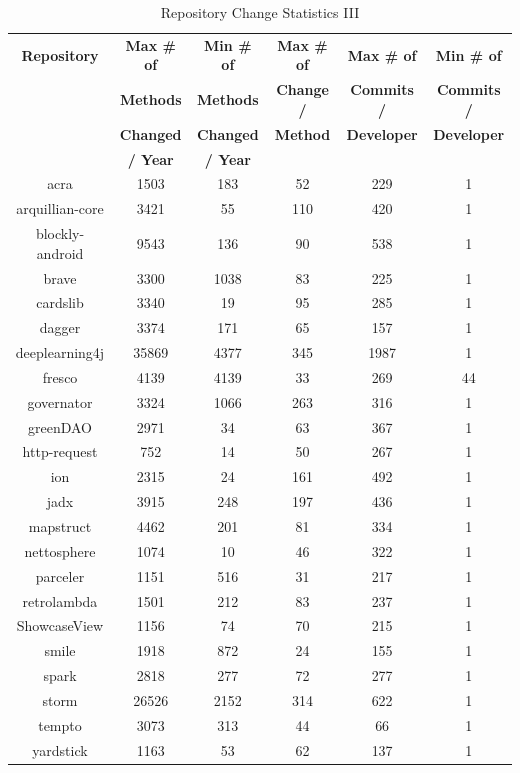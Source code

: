 \begin{table}
\begin{center}
    \begin{tabular}{|c|c|c|c|c|c|}
        \hline
        \textbf{Repository} & \textbf{Max \# of} & \textbf{Min \# of} & \textbf{Max \# of} & \textbf{Max \# of} & \textbf{Min \# of} \\
         & \textbf{Methods} & \textbf{Methods} & \textbf{Change /} & \textbf{Commits /} & \textbf{Commits /} \\
         & \textbf{Changed} & \textbf{Changed} & \textbf{Method} & \textbf{Developer} & \textbf{Developer} \\
         & \textbf{/ Year} & \textbf{/ Year} & & & \\
        \hline
        acra & 1503 & 183 & 52 & 229 & 1 \\
        arquillian-core & 3421 & 55 & 110 & 420 & 1 \\
        blockly-android & 9543 & 136 & 90 & 538 & 1 \\
        brave & 3300 & 1038 & 83 & 225 & 1 \\
        cardslib & 3340 & 19 & 95 & 285 & 1 \\
        dagger & 3374 & 171 & 65 & 157 & 1 \\
        deeplearning4j & 35869 & 4377 & 345 & 1987 & 1 \\
        fresco & 4139 & 4139 & 33 & 269 & 44 \\
        governator & 3324 & 1066 & 263 & 316 & 1 \\
        greenDAO & 2971 & 34 & 63 & 367 & 1 \\
        http-request & 752 & 14 & 50 & 267 & 1 \\
        ion & 2315 & 24 & 161 & 492 & 1 \\
        jadx & 3915 & 248 & 197 & 436 & 1 \\
        mapstruct & 4462 & 201 & 81 & 334 & 1 \\
        nettosphere & 1074 & 10 & 46 & 322 & 1 \\
        parceler & 1151 & 516 & 31 & 217 & 1 \\
        retrolambda & 1501 & 212 & 83 & 237 & 1 \\
        ShowcaseView & 1156 & 74 & 70 & 215 & 1 \\
        smile & 1918 & 872 & 24 & 155 & 1 \\
        spark & 2818 & 277 & 72 & 277 & 1 \\
        storm & 26526 & 2152 & 314 & 622 & 1 \\
        tempto & 3073 & 313 & 44 & 66 & 1 \\
        yardstick & 1163 & 53 & 62 & 137 & 1 \\
        \hline
    \end{tabular}
\end{center}
\caption{Repository Change Statistics III}
\label{tab:repository_stats_3}
\end{table}

